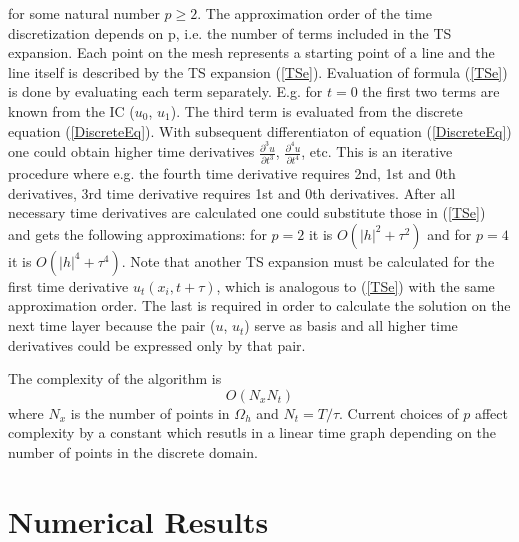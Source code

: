 \documentclass[%
 aip,
cp,  
 amsmath,amssymb,
 reprint,
]{iopconfser}
\newcommand{\rf}[1]{(\ref{#1})}
\begin{document}
for some natural number $p \ge 2$. The approximation order of the time discretization depends on p, i.e. the number of terms included in the TS expansion. Each point on the mesh represents a starting point of a line and the line itself is described by the TS expansion \rf{TSe}. Evaluation of formula \rf{TSe} is done by evaluating each term separately. E.g. for $t=0$ the first two terms are known from the IC ($u_0$, $u_1$). The third term is evaluated from the discrete equation \rf{DiscreteEq}. With subsequent differentiaton of equation \rf{DiscreteEq} one could obtain higher time derivatives $\frac{\partial^3 u}{\partial t^3}$, $\frac{\partial^4 u}{\partial t^4}$, etc. This is an iterative procedure where e.g. the fourth time derivative requires 2nd, 1st and 0th derivatives, 3rd time derivative requires 1st and 0th derivatives. After all necessary time derivatives are calculated one could substitute those in \rf{TSe} and gets the following approximations: for $p=2$ it is $O(|h|^2 + \tau^2)$ and for $p=4$ it is $O(|h|^4 + \tau^4)$. Note that another TS expansion must be calculated for the first time derivative $u_t(x_i, t+\tau)$, which is analogous to \rf{TSe} with the same approximation order. The last is required in order to calculate the solution on the next time layer because the pair ($u$, $u_t$) serve as basis and all higher time derivatives could be expressed only by that pair.

The complexity of the algorithm is
$$ O( N_x  N_t ) $$
where $N_x$ is the number of points in $\Omega_h$ and $N_t = T/\tau$. Current choices of $p$ affect complexity by a constant which resutls in a linear time graph depending on the number of points in the discrete domain.


\section{Numerical Results}
\end{document}
